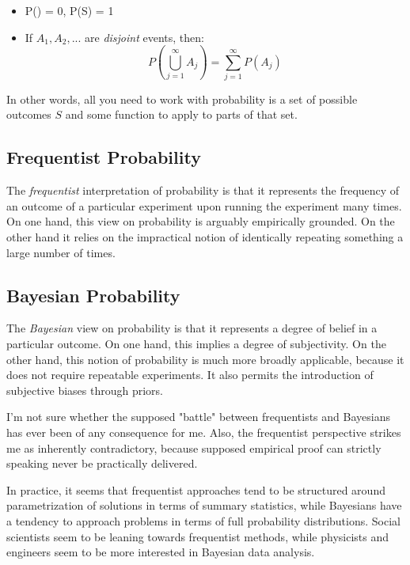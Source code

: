 \begin{itemize}
\item P(\empty) = 0, P(S) = 1
\item If $A_1, A_2,...$ are \textit{disjoint} events, then: \begin{equation}P\left(\bigcup^{\infty}_{j=1}A_j \right) = \sum_{j=1}^{\infty}P(A_j)\end{equation}
\end{itemize}

In other words, all you need to work with probability is a set of possible outcomes $S$ and some function to apply to parts of that set.

\subsection{Frequentist Probability}
The \textit{frequentist} interpretation of probability is that it represents the frequency of an outcome of a particular experiment upon running the experiment many times. On one hand, this view on probability is arguably empirically grounded. On the other hand it relies on the impractical notion of identically repeating something a large number of times. 

\subsection{Bayesian Probability}
The \textit{Bayesian} view on probability is that it represents a degree of belief in a particular outcome. On one hand, this implies a degree of subjectivity. On the other hand, this notion of probability is much more broadly applicable, because it does not require repeatable experiments. It also permits the introduction of subjective biases through priors.

I'm not sure whether the supposed "battle" between frequentists and Bayesians has ever been of any consequence for me. Also, the frequentist perspective strikes me as inherently contradictory, because supposed empirical proof can strictly speaking never be practically delivered.

In practice, it seems that frequentist approaches tend to be structured around parametrization of solutions in terms of summary statistics, while Bayesians have a tendency to approach problems in terms of full probability distributions. Social scientists seem to be leaning towards frequentist methods, while physicists and engineers seem to be more interested in Bayesian data analysis. 

